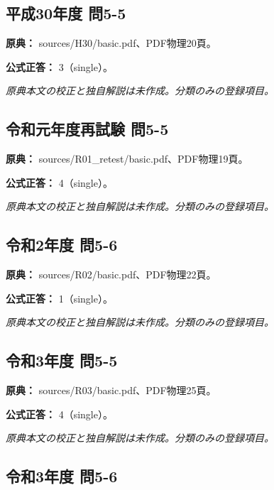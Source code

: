\subsection{平成30年度 問5-5}
\label{q:h30-reg-basic-5-5}

\noindent\textbf{原典：} sources/H30/basic.pdf、PDF物理20頁。

\textbf{公式正答：} 3（single）。

\par\textit{原典本文の校正と独自解説は未作成。分類のみの登録項目。}

\subsection{令和元年度再試験 問5-5}
\label{q:r01-ret-basic-5-5}

\noindent\textbf{原典：} sources/R01\_retest/basic.pdf、PDF物理19頁。

\textbf{公式正答：} 4（single）。

\par\textit{原典本文の校正と独自解説は未作成。分類のみの登録項目。}

\subsection{令和2年度 問5-6}
\label{q:r02-reg-basic-5-6}

\noindent\textbf{原典：} sources/R02/basic.pdf、PDF物理22頁。

\textbf{公式正答：} 1（single）。

\par\textit{原典本文の校正と独自解説は未作成。分類のみの登録項目。}

\subsection{令和3年度 問5-5}
\label{q:r03-reg-basic-5-5}

\noindent\textbf{原典：} sources/R03/basic.pdf、PDF物理25頁。

\textbf{公式正答：} 4（single）。

\par\textit{原典本文の校正と独自解説は未作成。分類のみの登録項目。}

\subsection{令和3年度 問5-6}
\label{q:r03-reg-basic-5-6}

